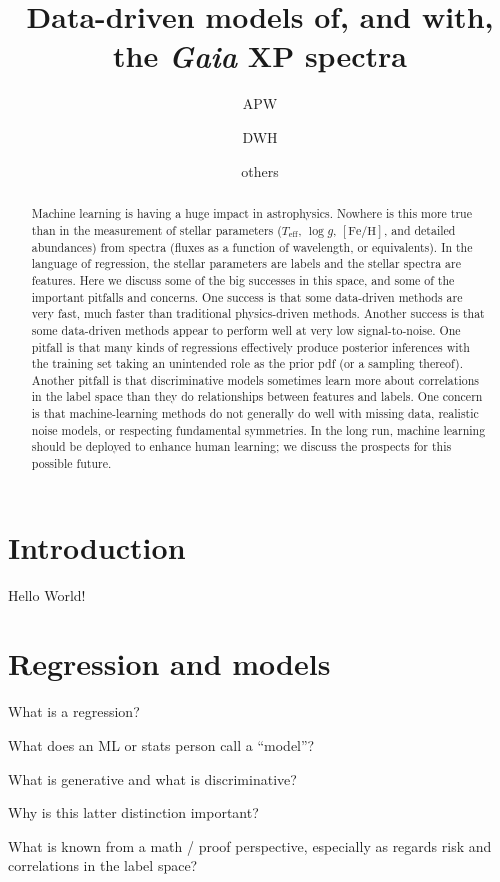\documentclass[modern]{aastex631}
\newcommand{\teff}{T_{\mathrm{eff}}}
\newcommand{\logg}{\log g}
\newcommand{\feh}{[\mathrm{Fe}/\mathrm{H}]}
\begin{document}
\title{Data-driven models of, and with, the \textsl{Gaia} XP spectra}

\author{APW}
\author{DWH}
\author{others}

\begin{abstract}\noindent %
  Machine learning is having a huge impact in astrophysics.
  Nowhere is this more true than in the measurement of stellar parameters ($\teff$, $\logg$, $\feh$, and detailed abundances) from spectra (fluxes as a function of wavelength, or equivalents).
  In the language of regression, the stellar parameters are labels and the stellar spectra are features.
  Here we discuss some of the big successes in this space, and some of the important pitfalls and concerns.
  One success is that some data-driven methods are very fast, much faster than traditional physics-driven methods.
  Another success is that some data-driven methods appear to perform well at very low signal-to-noise.
  One pitfall is that many kinds of regressions effectively produce posterior inferences with the training set taking an unintended role as the prior pdf (or a sampling thereof).
  Another pitfall is that discriminative models sometimes learn more about correlations in the label space than they do relationships between features and labels.
  One concern is that machine-learning methods do not generally do well with missing data, realistic noise models, or respecting fundamental symmetries.
  In the long run, machine learning should be deployed to enhance human learning; we discuss the prospects for this possible future.
\end{abstract}

\section{Introduction} \label{sec:intro}

Hello World!

\section{Regression and models}

What is a regression?

What does an ML or stats person call a ``model''?

What is generative and what is discriminative?

Why is this latter distinction important?

What is known from a math / proof perspective, especially as regards risk and correlations in the label space?
\end{document}
